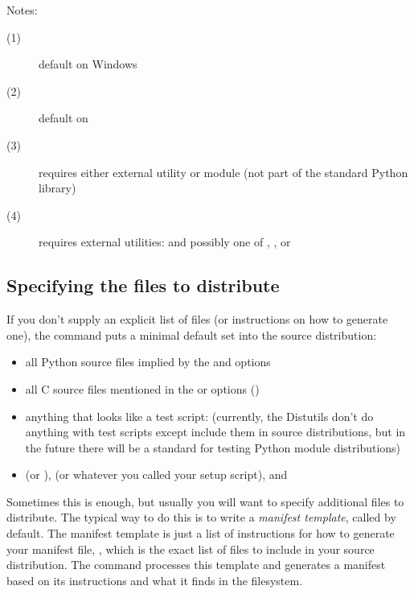 \documentclass{howto}
\begin{document}
\noindent Notes:
\begin{description}
\item[(1)] default on Windows
\item[(2)] default on \UNIX
\item[(3)] requires either external  utility or
   module (not part of the standard Python library)
\item[(4)] requires external utilities:  and possibly one
  of , , or 
\end{description}



\subsection{Specifying the files to distribute}
\label{manifest}

If you don't supply an explicit list of files (or instructions on how to
generate one), the  command puts a minimal default set
into the source distribution:
\begin{itemize}
\item all Python source files implied by the  and
   options
\item all C source files mentioned in the  or
   options ()
\item anything that looks like a test script: 
  (currently, the Distutils don't do anything with test scripts except
  include them in source distributions, but in the future there will be
  a standard for testing Python module distributions)
\item {} (or ),  (or whatever 
  you called your setup script), and 
\end{itemize}
Sometimes this is enough, but usually you will want to specify
additional files to distribute.  The typical way to do this is to write
a \emph{manifest template}, called  by default.  The
manifest template is just a list of instructions for how to generate
your manifest file, , which is the exact list of files to
include in your source distribution.  The  command
processes this template and generates a manifest based on its
instructions and what it finds in the filesystem.
\end{document}
